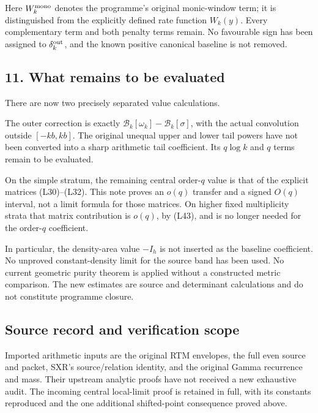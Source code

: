 Here \(W_k^{\rm mono}\) denotes the programme's original monic-window term; it is distinguished from the explicitly defined rate function \(W_k(y)\). Every complementary term and both penalty terms remain. No favourable sign has been assigned to \(\delta_k^{\rm out}\), and the known positive canonical baseline is not removed.

\subsection{11. What remains to be evaluated}\label{what-remains-to-be-evaluated}

There are now two precisely separated value calculations.

The outer correction is exactly \(\mathcal B_k[\omega_k]-\mathcal B_k[\sigma]\), with the actual convolution outside \([-kb,kb]\). The original unequal upper and lower tail powers have not been converted into a sharp arithmetic tail coefficient. Its \(q\log k\) and \(q\) terms remain to be evaluated.

On the simple stratum, the remaining central order-\(q\) value is that of the explicit matrices (L30)--(L32). This note proves an \(o(q)\) transfer and a signed \(O(q)\) interval, not a limit formula for those matrices. On higher fixed multiplicity strata that matrix contribution is \(o(q)\), by (L43), and is no longer needed for the order-\(q\) coefficient.

In particular, the density-area value \(-I_h\) is not inserted as the baseline coefficient. No unproved constant-density limit for the source band has been used. No current geometric purity theorem is applied without a constructed metric comparison. The new estimates are source and determinant calculations and do not constitute programme closure.

\subsection{Source record and verification scope}\label{source-record-and-verification-scope}

Imported arithmetic inputs are the original RTM envelopes, the full even source and packet, SXR's source/relation identity, and the original Gamma recurrence and mass. Their upstream analytic proofs have not received a new exhaustive audit. The incoming central local-limit proof is retained in full, with its constants reproduced and the one additional shifted-point consequence proved above.

